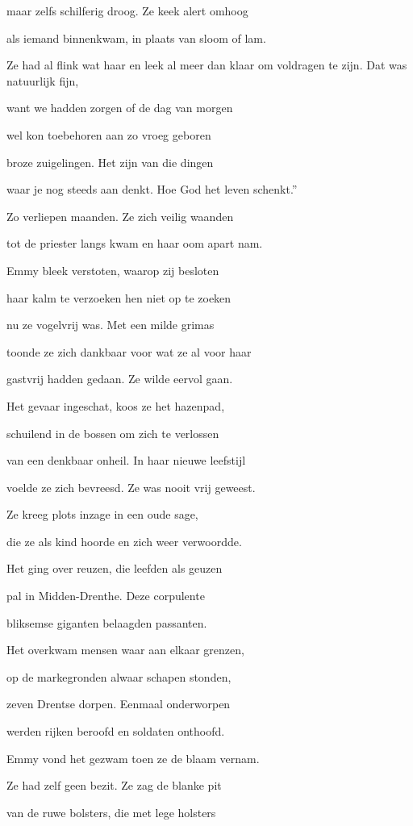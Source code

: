 maar zelfs schilferig droog.
Ze keek alert omhoog

als iemand binnenkwam,
in plaats van sloom of lam.

Ze had al flink wat haar
en leek al meer dan klaar
om voldragen te zijn.
Dat was natuurlijk fijn,

want we hadden zorgen
of de dag van morgen

wel kon toebehoren
aan zo vroeg geboren

broze zuigelingen.
Het zijn van die dingen

waar je nog steeds aan denkt.
Hoe God het leven schenkt.”

Zo verliepen maanden.
Ze zich veilig waanden

tot de priester langs kwam
en haar oom apart nam.

Emmy bleek verstoten,
waarop zij besloten

haar kalm te verzoeken
hen niet op te zoeken

nu ze vogelvrij was.
Met een milde grimas

toonde ze zich dankbaar
voor wat ze al voor haar

gastvrij hadden gedaan.
Ze wilde eervol gaan.

Het gevaar ingeschat,
koos ze het hazenpad,

schuilend in de bossen
om zich te verlossen

van een denkbaar onheil.
In haar nieuwe leefstijl

voelde ze zich bevreesd.
Ze was nooit vrij geweest.

Ze kreeg plots inzage
in een oude sage,

die ze als kind hoorde
en zich weer verwoordde.

Het ging over reuzen,
die leefden als geuzen

pal in Midden-Drenthe.
Deze corpulente

bliksemse giganten
belaagden passanten.

Het overkwam mensen
waar aan elkaar grenzen,

op de markegronden
alwaar schapen stonden,

zeven Drentse dorpen. Eenmaal onderworpen

werden rijken beroofd
en soldaten onthoofd.

Emmy vond het gezwam
toen ze de blaam vernam.

Ze had zelf geen bezit.
Ze zag de blanke pit

van de ruwe bolsters,
die met lege holsters

